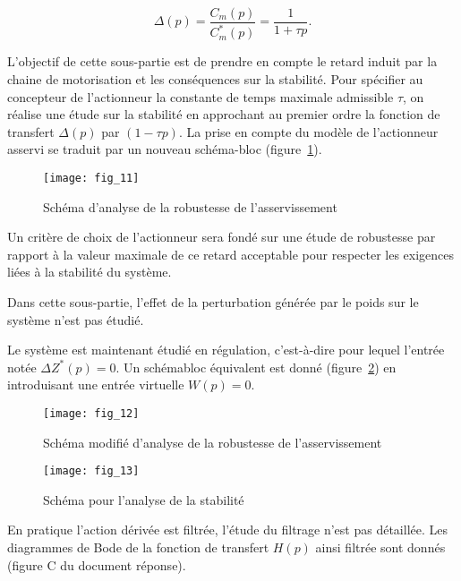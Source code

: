 $$
\Delta(p)=\frac{C_{m}(p)}{C_{m}^{*}(p)}=\frac{1}{1+\tau p} .
$$

L'objectif de cette sous-partie est de prendre en compte le retard induit par la chaine de motorisation et les conséquences sur la stabilité. Pour spécifier au concepteur de l'actionneur la constante de temps maximale admissible $\tau$, on réalise une étude sur la stabilité en approchant au premier ordre la fonction de transfert $\Delta(p)$ par $(1-\tau p)$. La prise en compte du modèle de l'actionneur asservi se traduit par un nouveau schéma-bloc (figure~\ref{fig:11}).


\begin{figure}[H]
\centering
\texttt{[image: fig\_11]}
\caption{\label{fig:11} Schéma d'analyse de la robustesse de l'asservissement}
\end{figure}


Un critère de choix de l'actionneur sera fondé sur une étude de robustesse par rapport à la valeur maximale de ce retard acceptable pour respecter les exigences liées à la stabilité du système.

Dans cette sous-partie, l'effet de la perturbation générée par le poids sur le système n'est pas étudié.

Le système est maintenant étudié en régulation, c'est-à-dire pour lequel l'entrée notée $\Delta Z^{*}(p)=0$. Un schémabloc équivalent est donné (figure~\ref{fig:12}) en introduisant une entrée virtuelle $W(p)=0$.

\begin{figure}[H]
\centering
\texttt{[image: fig\_12]}
\caption{\label{fig:12} Schéma modifié d'analyse de la robustesse de l'asservissement}
\end{figure}



\ifprof
\begin{corrige}
\end{corrige}
\else
\fi

\begin{figure}[H]
\centering
\texttt{[image: fig\_13]}
\caption{\label{fig:13} Schéma pour l'analyse de la stabilité}
\end{figure}

En pratique l'action dérivée est filtrée, l'étude du filtrage n'est pas détaillée. Les diagrammes de Bode de la fonction de transfert $H(p)$ ainsi filtrée sont donnés (figure $\mathrm{C}$ du document réponse). 

